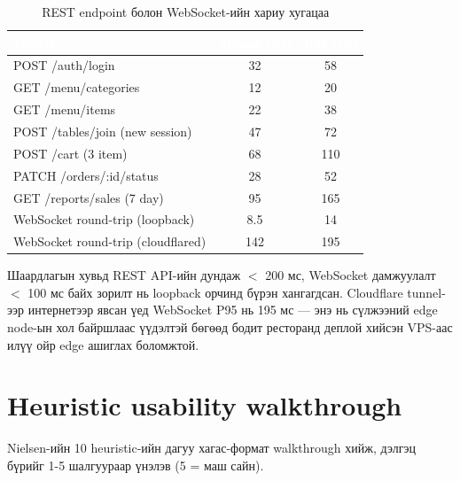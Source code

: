 \begin{table}[htbp]
\caption{REST endpoint болон WebSocket-ийн хариу хугацаа}
\label{tab:perf}
\centering
\begin{tabularx}{\textwidth}{|L|c|c|}
\hline
{}
\textcolor{white}{\textbf{Үйлдэл}} &
\textcolor{white}{\textbf{Дундаж (мс)}} &
\textcolor{white}{\textbf{P95 (мс)}} \\ \hline
POST /auth/login                  & 32   & 58   \\ \hline
{}
GET /menu/categories              & 12   & 20   \\ \hline
GET /menu/items                   & 22   & 38   \\ \hline
{}
POST /tables/join (new session)   & 47   & 72   \\ \hline
POST /cart (3 item)               & 68   & 110  \\ \hline
{}
PATCH /orders/:id/status          & 28   & 52   \\ \hline
GET /reports/sales (7 day)        & 95   & 165  \\ \hline
{}
WebSocket round-trip (loopback)   & 8.5  & 14   \\ \hline
WebSocket round-trip (cloudflared)& 142  & 195  \\ \hline
\end{tabularx}
\end{table}

Шаардлагын хувьд REST API-ийн дундаж $<$ 200 мс, WebSocket дамжуулалт $<$ 100 мс байх
зорилт нь loopback орчинд бүрэн хангагдсан. Cloudflare tunnel-ээр интернетээр явсан
үед WebSocket P95 нь 195 мс — энэ нь сүлжээний edge node-ын хол байршлаас үүдэлтэй
бөгөөд бодит ресторанд деплой хийсэн VPS-аас илүү ойр edge ашиглах боломжтой.

\section{Heuristic usability walkthrough}

Nielsen-ийн 10 heuristic-ийн дагуу хагас-формат walkthrough хийж, дэлгэц бүрийг
1-5 шалгуураар үнэлэв (5 = маш сайн).

